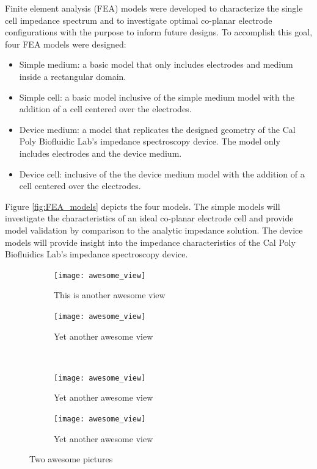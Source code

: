 \par Finite element analysis (FEA) models were developed to characterize the single cell impedance spectrum and to investigate optimal co-planar electrode configurations with the purpose to inform future designs. To accomplish this goal, four FEA models were designed:

\begin{itemize}
    \item Simple medium: a basic model that only includes electrodes and medium inside a rectangular domain.
    \item Simple cell: a basic model inclusive of the simple medium model with the addition of a cell centered over the electrodes.
    \item Device medium: a model that replicates the designed geometry of the Cal Poly Biofluidic Lab's impedance spectroscopy device. The model only includes electrodes and the device medium.   
    \item Device cell: inclusive of the the device medium model with the addition of a cell centered over the electrodes. 
\end{itemize}

\par Figure \ref{fig:FEA_models} depicts the four models. The simple models will investigate the characteristics of an ideal co-planar electrode cell and provide model validation by comparison to the analytic impedance solution. The device models will provide insight into the impedance characteristics of the Cal Poly Biofluidics Lab's impedance spectroscopy device. 

\begin{figure}
    \centering
    \begin{subfigure}[b]{0.45\textwidth}
        \centering
        \texttt{[image: awesome\_view]}
        \caption{This is another awesome view}
        \label{fig:another_awesome_view_a}
    \end{subfigure}
    \hfill
    \begin{subfigure}[b]{0.45\textwidth}
        \centering
        \texttt{[image: awesome\_view]}
        \caption{Yet another awesome view}
        \label{fig:another_awesome_view_b}
    \end{subfigure}
    \\
    \begin{subfigure}[b]{0.45\textwidth}
        \centering
        \texttt{[image: awesome\_view]}
        \caption{Yet another awesome view}
        \label{fig:another_awesome_view_b}
    \end{subfigure}
    \hfill
    \begin{subfigure}[b]{0.45\textwidth}
        \centering
        \texttt{[image: awesome\_view]}
        \caption{Yet another awesome view}
        \label{fig:another_awesome_view_b}
    \end{subfigure}
    \caption{Two awesome pictures}
    \label{fig:two_awesome_pictures}
\end{figure}


